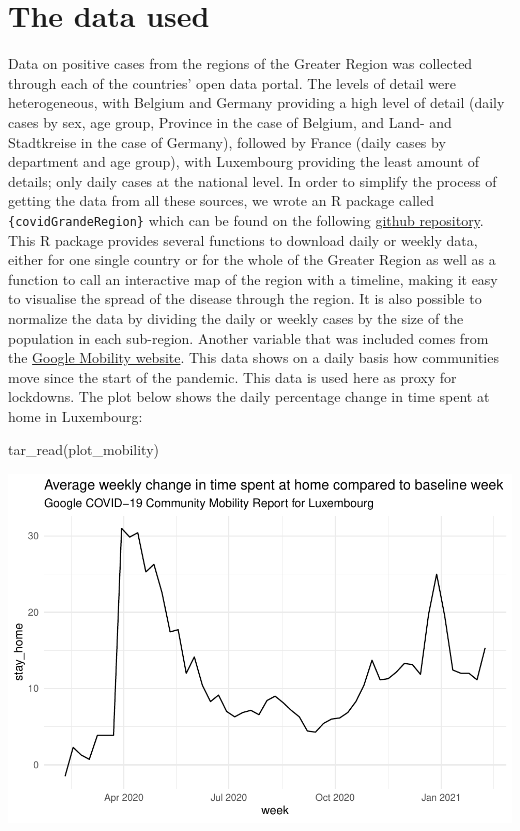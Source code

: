 \documentclass{article}
\newenvironment{Shaded}{\begin{snugshade}}{\end{snugshade}}
\newcommand{\FunctionTok}[1]{\textcolor[rgb]{0.00,0.00,0.00}{#1}}
\newcommand{\NormalTok}[1]{#1}
\begin{document}
\hypertarget{the-data-used}{%
\section{The data used}\label{the-data-used}}

Data on positive cases from the regions of the Greater Region was
collected through each of the countries' open data portal. The levels of
detail were heterogeneous, with Belgium and Germany providing a high
level of detail (daily cases by sex, age group, Province in the case of
Belgium, and Land- and Stadtkreise in the case of Germany), followed by
France (daily cases by department and age group), with Luxembourg
providing the least amount of details; only daily cases at the national
level. In order to simplify the process of getting the data from all
these sources, we wrote an R package called
\texttt{\{covidGrandeRegion\}} which can be found on the following
\href{https://github.com/b-rodrigues/covidGrandeRegion}{github
repository}. This R package provides several functions to download daily
or weekly data, either for one single country or for the whole of the
Greater Region as well as a function to call an interactive map of the
region with a timeline, making it easy to visualise the spread of the
disease through the region. It is also possible to normalize the data by
dividing the daily or weekly cases by the size of the population in each
sub-region. Another variable that was included comes from the
\href{https://www.google.com/covid19/mobility/}{Google Mobility
website}. This data shows on a daily basis how communities move since
the start of the pandemic. This data is used here as proxy for
lockdowns. The plot below shows the daily percentage change in time
spent at home in Luxembourg:

\begin{Shaded}
\begin{Highlighting}[]
\FunctionTok{tar\_read}\NormalTok{(plot\_mobility)}
\end{Highlighting}
\end{Shaded}

\includegraphics{paper_files/figure-latex/unnamed-chunk-4-1.pdf}
\end{document}
